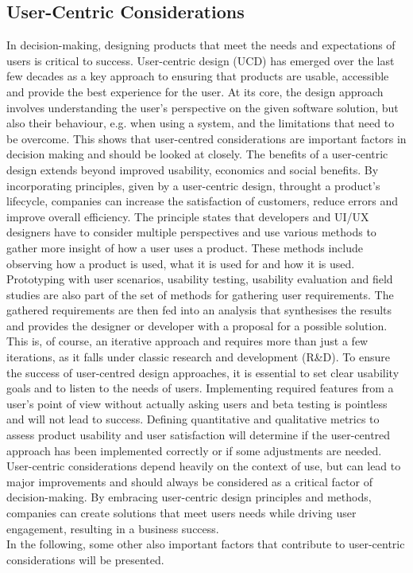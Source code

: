 \subsection{User-Centric Considerations}
In decision-making, designing products that meet the needs and expectations of users is critical to success. User-centric design (UCD) has emerged over the last few decades as a key approach to ensuring that products are usable, accessible and provide the best experience for the user. At its core, the design approach involves understanding the user's perspective on the given software solution, but also their behaviour, e.g. when using a system, and the limitations that need to be overcome. This shows that user-centred considerations are important factors in decision making and should be looked at closely.
\newline \noindent The benefits of a user-centric design extends beyond improved usability, economics and social benefits. By incorporating principles, given by a user-centric design, throught a product's lifecycle, companies can increase the satisfaction of customers, reduce errors and improve overall efficiency. The principle states that developers and UI/UX designers have to consider multiple perspectives and use various methods to gather more insight of how a user uses a product. 
\newline \noindent These methods include observing how a product is used, what it is used for and how it is used. Prototyping with user scenarios, usability testing, usability evaluation and field studies are also part of the set of methods for gathering user requirements. The gathered requirements are then fed into an analysis that synthesises the results and provides the designer or developer with a proposal for a possible solution. This is, of course, an iterative approach and requires more than just a few iterations, as it falls under classic research and development (R\&D).
\newline \noindent To ensure the success of user-centred design approaches, it is essential to set clear usability goals and to listen to the needs of users. Implementing required features from a user's point of view without actually asking users and beta testing is pointless and will not lead to success. Defining quantitative and qualitative metrics to assess product usability and user satisfaction will determine if the user-centred approach has been implemented correctly or if some adjustments are needed. 
\newline \noindent User-centric considerations depend heavily on the context of use, but can lead to major improvements and should always be considered as a critical factor of decision-making. By embracing user-centric design principles and methods, companies can create solutions that meet users needs while driving user engagement, resulting in a business success. \cite{rannikko_user-centered_2011}\newline 
\\
\noindent In the following, some other also important factors that contribute to user-centric considerations will be presented. 

